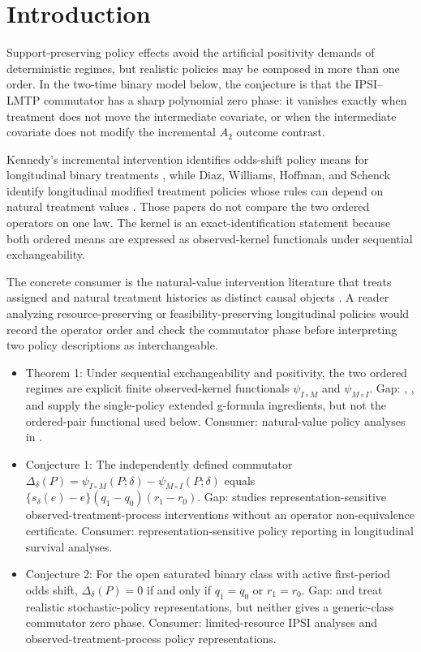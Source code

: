 \documentclass[11pt]{article}
\theoremstyle{definition}
\theoremstyle{plain}
\theoremstyle{remark}
\begin{document}
\section{Introduction}
Support-preserving policy effects avoid the artificial positivity demands of deterministic regimes, but realistic policies may be composed in more than one order. In the two-time binary model below, the conjecture is that the IPSI--LMTP commutator has a sharp polynomial zero phase: it vanishes exactly when treatment does not move the intermediate covariate, or when the intermediate covariate does not modify the incremental $A_2$ outcome contrast.

Kennedy's incremental intervention identifies odds-shift policy means for longitudinal binary treatments \citep[p.~646, Sec.~2]{Kennedy2019JASA}, while Diaz, Williams, Hoffman, and Schenck identify longitudinal modified treatment policies whose rules can depend on natural treatment values \citep[Sec.~2]{DiazWilliamsHoffmanSchenck2023JASA}. Those papers do not compare the two ordered operators on one law. The kernel is an exact-identification statement because both ordered means are expressed as observed-kernel functionals under sequential exchangeability.

The concrete consumer is the natural-value intervention literature that treats assigned and natural treatment histories as distinct causal objects \citep{YoungHernanRobins2014EM}. A reader analyzing resource-preserving or feasibility-preserving longitudinal policies would record the operator order and check the commutator phase before interpreting two policy descriptions as interchangeable.

\begin{itemize}[leftmargin=*]
\item Theorem 1: Under sequential exchangeability and positivity, the two ordered regimes are explicit finite observed-kernel functionals $\psi_{I\circ M}$ and $\psi_{M\circ I}$. Gap: \citet{Kennedy2019JASA}, \citet{DiazWilliamsHoffmanSchenck2023JASA}, and \citet{YoungHernanRobins2014EM} supply the single-policy extended g-formula ingredients, but not the ordered-pair functional used below. Consumer: natural-value policy analyses in \citet{YoungHernanRobins2014EM}.
\item Conjecture 1: The independently defined commutator $\Delta_\delta(P)=\psi_{I\circ M}(P;\delta)-\psi_{M\circ I}(P;\delta)$ equals $\{s_\delta(e)-e\}(q_1-q_0)(r_1-r_0)$. Gap: \citet{WenMarcusYoung2023SMMR} studies representation-sensitive observed-treatment-process interventions without an operator non-equivalence certificate. Consumer: representation-sensitive policy reporting in longitudinal survival analyses.
\item Conjecture 2: For the open saturated binary class with active first-period odds shift, $\Delta_\delta(P)=0$ if and only if $q_1=q_0$ or $r_1=r_0$. Gap: \citet[p.~3420, Sec.~2.2]{SarvetWanisYoungHernandezAlejandroStensrud2023Biometrics} and \citet[Sec.~2]{WenMarcusYoung2023SMMR} treat realistic stochastic-policy representations, but neither gives a generic-class commutator zero phase. Consumer: limited-resource IPSI analyses and observed-treatment-process policy representations.
\end{itemize}
\end{document}
